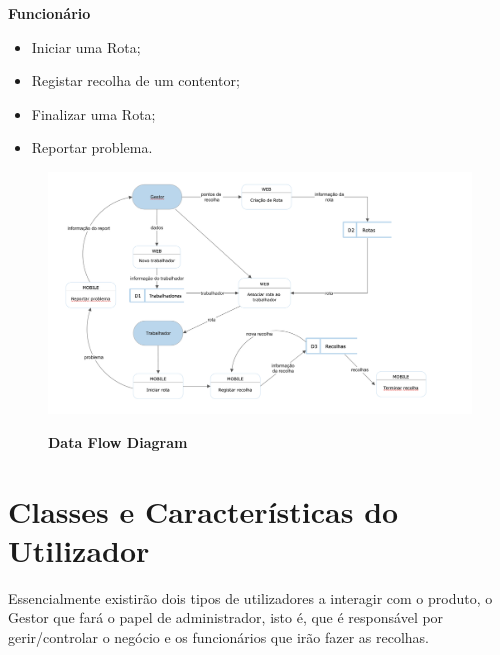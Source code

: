 \documentclass{scrreprt}
\begin{document}
	\textbf{Funcionário}
	\begin{itemize}
		\item Iniciar uma Rota;
		\item Registar recolha de um contentor;
		\item Finalizar uma Rota;
		\item Reportar problema.
	\end{itemize}
	
	\begin{figure}[H]
		\centering
		\includegraphics[scale=.55]{imagens/DataFlowDiagram}
		\par \textbf{Data Flow Diagram}
		\label{fig:DataFlowDiagram}
	\end{figure}
	
	\newpage
	
	\section{Classes e Características do Utilizador}
	Essencialmente existirão dois tipos de utilizadores a interagir com o produto, o Gestor que fará o papel de administrador, isto é, que é responsável por gerir/controlar o negócio e os funcionários que irão fazer as recolhas. 
	
\end{document}
